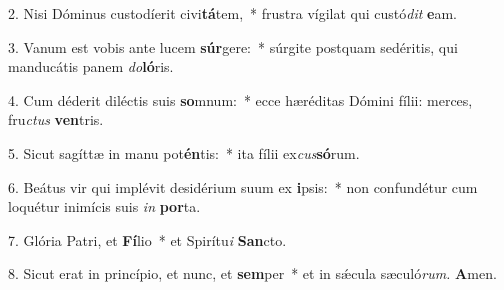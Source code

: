 \item 2. Nisi Dóminus custodíerit civi\textbf{tá}tem,~* frustra vígilat qui custó\textit{dit} \textbf{e}am.
\item 3. Vanum est vobis ante lucem \textbf{súr}gere:~* súrgite postquam sedéritis, qui manducátis panem \textit{do}\textbf{ló}ris.
\item 4. Cum déderit diléctis suis \textbf{so}mnum:~* ecce hæréditas Dómini fílii: merces, fru\hspace{0.03em}\textit{ctus} \textbf{ven}tris.
\item 5. Sicut sagíttæ in manu pot\textbf{én}tis:~* ita fílii ex\hspace{0.03em}\textit{cus}\textbf{só}rum.
\item 6. Beátus vir qui implévit desidérium suum ex \textbf{i}psis:~* non confundétur cum loquétur inimícis suis \textit{in} \textbf{por}ta.
\item 7. Glória Patri, et \textbf{Fí}lio~* et Spirítu\hspace{0.03em}\textit{i} \textbf{San}cto.
\item 8. Sicut erat in princípio, et nunc, et \textbf{sem}per~* et in sǽcula sæculó\textit{rum.} \textbf{A}men.